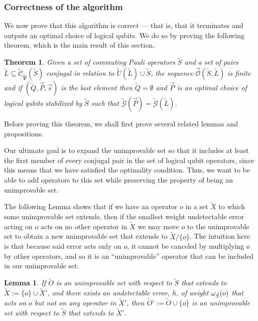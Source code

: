 \documentclass[twocolumn,showpacs,preprintnumbers,amsmath,amssymb,nofootinbib,pra,floatfix]{revtex4-1}
\newtheorem{theorem}{Theorem}
\newtheorem{lemma}{Lemma}
\newenvironment{remark}[1][Remark]{\begin{trivlist}
\item[\hskip \labelsep {\bfseries #1}]}{\end{trivlist}}
\newcommand{\lst}{\vec}
\newcommand{\set}{\tilde}
\newcommand{\genfun}{\tilde{\mathcal{G}}}
\newcommand{\pauligroup}{{\set{\mathfrak{P}}}}
\newcommand{\centralizer}{\set{\mathcal{C}}}
\newcommand{\optimizer}{\lst{\mathcal{O}}}
\begin{document}
\subsubsection{Correctness of the algorithm}

We now prove that this algorithm is correct --- that is, that it terminates and outputs an optimal choice of logical qubits.  We do so by proving the following theorem, which is the main result of this section.

\begin{theorem}
\label{theorem:algorithm is correct}
Given a set of commuting Pauli operators $\set S$ and a set of pairs $\set L\subseteq\centralizer_\pauligroup(\set S)$ conjugal in relation to $\set U(\set L)\cup\set S$, the sequence $\optimizer(\set S,\set L)$ is finite and if $(\set Q,\lst P,\lst s)$ is the last element then $\set Q=\emptyset$ and $\lst P$ is an optimal choice of logical qubits stabilized by $\set S$ such that $\genfun(\lst P)=\genfun(\set L)$.
\end{theorem}
\begin{remark}
Before proving this theorem, we shall first prove several related lemmas and propositions.

Our ultimate goal is to expand the unimprovable set so that it includes at least the first member of every conjugal pair in the set of logical qubit operators, since this means that we have satisfied the optimality condition.  Thus, we want to be able to add operators to this set while preserving the property of being an unimprovable set.

The following Lemma shows that if we have an operator $o$ in a set $\set X$ to which some unimprovable set extends, then if the smallest weight undetectable error acting on $o$ acts on no other operator in $\set X$ we may move $o$ to the unimprovable set to obtain a new unimprovable set that extends to $\set X\slash \{o\}$.  The intuition here is that because said error acts only on $o$, it cannot be canceled by multiplying $o$ by other operators, and so it is an ``unimprovable'' operator that can be included in our unimprovable set.
\end{remark}

\begin{lemma}
\label{lemma:move-it-over}
If $\set O$ is an unimprovable set with respect to $\set S$ that extends to $\set X:=\{o\}\cup\set X'$, and there exists an undetectable error, $h$, of weight $\om_{\set S}(o)$ that acts on $o$ but not on any operator in $\set X'$, then $\set O':=\set O\cup\{o\}$ is an unimprovable set with respect to $\set S$ that extends to $\set X'$.
\end{lemma}
\end{document}
